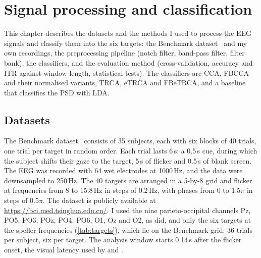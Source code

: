 
\chapter{Signal processing and classification}
\label{ch:processing}

This chapter describes the datasets and the methods I used to process the \ac{EEG} signals
and classify them into the six targets: the Benchmark dataset~\citep{wang2017benchmark} and
my own recordings, the preprocessing pipeline (notch filter, band-pass filter, filter bank),
the classifiers, and the evaluation method (cross-validation, accuracy and \ac{ITR} against
window length, statistical tests). The classifiers are \ac{CCA},
\ac{FBCCA} and their normalised variants, \ac{TRCA}, \ac{eTRCA} and \ac{FBeTRCA}, and a
baseline that classifies the \ac{PSD} with \ac{LDA}.

\section{Datasets}
\label{sec:datasets}

The Benchmark dataset~\citep{wang2017benchmark} consists of 35 subjects, each with six
blocks of 40 trials, one trial per target in random order. Each trial lasts 6\,s: a 0.5\,s
cue, during which the subject shifts their gaze to the target, 5\,s of flicker and 0.5\,s of
blank screen. The \ac{EEG} was recorded with 64 wet electrodes at 1000\,Hz, and the data were
downsampled to 250\,Hz. The 40 targets are arranged in a 5-by-8 grid and flicker at
frequencies from 8 to 15.8\,Hz in steps of 0.2\,Hz, with phases from 0 to $1.5\pi$ in steps
of $0.5\pi$. The dataset is publicly available at
\url{https://bci.med.tsinghua.edu.cn/}. I used the nine parieto-occipital channels Pz, PO5,
PO3, POz, PO4, PO6, O1, Oz and O2, as \citet{nakanishi2018trca} did, and only the six targets
at the speller frequencies (\cref{tab:targets}), which lie on the Benchmark grid: 36 trials
per subject, six per target. The analysis window starts 0.14\,s after the flicker onset, the
visual latency used by \citet{wang2017benchmark} and \citet{nakanishi2018trca}.


